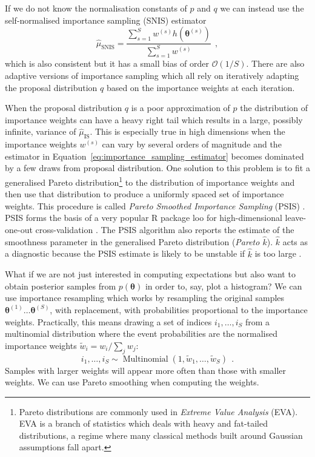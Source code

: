 \documentclass[12pt,dvipsnames]{report}
\newcommand{\ssf}[1]{\textsf{#1}}
\renewcommand{\vec}[1]{\boldsymbol{\mathbf{#1}}}
\newcommand{\hquad}{~~}
\begin{document}
If we do not know the normalisation constants of $p$ and $q$ we can instead use the 
self-normalised importance sampling (SNIS)  estimator 
\begin{equation}
    \hat{\mu}_{\mathrm{SNIS}}=\frac{\sum_{s=1}^{S} w^{(s)} h\left(\boldsymbol{\theta}^{(s)}\right)}{\sum_{s=1}^{S} w^{(s)}}
    \hquad,
\label{eq:importance_sampling_estimator}
\end{equation}
which is also consistent but it has a small bias of order $\mathcal{O}(1/S)$.
There are also adaptive versions of importance sampling  which all rely on iteratively 
adapting the proposal distribution $q$ based on the importance weights at each iteration. 

When the proposal distribution $q$ is a poor approximation of $p$ the distribution of 
importance weights can have a heavy right tail which results in a large,
possibly infinite, variance of $\hat{\mu}_{\mathrm{IS}}$.
This is especially true in high dimensions when the importance weights $w^{(s)}$ can 
vary by several orders of magnitude and the estimator in 
Equation~\ref{eq:importance_sampling_estimator} becomes dominated by a few draws from 
proposal distribution. One solution to this  problem is to fit a generalised 
Pareto distribution\footnote{Pareto distributions are commonly used in \emph{Extreme 
Value Analysis} (EVA). EVA is a branch of statistics which deals with heavy and fat-tailed 
distributions, a regime where many classical methods built around Gaussian assumptions 
fall apart.} 
to the distribution of importance weights and then use that distribution to produce 
a uniformly spaced set of importance weights. This procedure is called 
\emph{Pareto Smoothed Importance Sampling} (PSIS) \citep{arXiv:1507.02646}.
PSIS forms the basis of a very popular \ssf{R} package \ssf{loo} for 
high-dimensional leave-one-out cross-validation \citep{arXiv:1507.04544}.
The PSIS algorithm also reports the estimate of the smoothness parameter in the
generalised Pareto distribution (\emph{Pareto $\hat{k}$}). $\hat{k}$ acts as a 
diagnostic  because the PSIS estimate is likely to be unstable  if $\hat{k}$ is 
too large \citep{arXiv:1507.02646}.

What if we are not just interested in computing expectations but also want to obtain 
posterior samples from $p(\vec{\theta})$ in order to, say, plot a histogram? We can 
use importance resampling which works by resampling the original samples 
$\vec{\theta}^{(1)} \dots \vec{\theta}^{(S)}$,
with replacement, with probabilities proportional to the importance weights.
Practically, this means drawing a set of indices $i_1, \dots, i_S$ from a 
multinomial distribution where the event probabilities are the normalised importance 
weights $\tilde{w}_{i}=w_{i} / \sum_{j} w_{j}$:
\begin{equation}
i_{1}, \ldots, i_{S} \sim \operatorname{Multinomial}\left(1, \tilde{w}_{1}, \ldots, \tilde{w}_{S}\right)
\hquad.
\end{equation}
Samples with larger weights will appear more often than those with smaller weights. 
We can use Pareto smoothing when computing the weights. 
\end{document}
